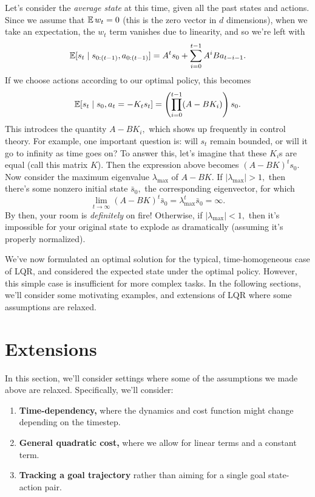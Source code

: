 \documentclass[../main/main]{subfiles}
\begin{document}
Let's consider the \emph{average state} at this time, given all the past states and actions.
Since we assume that $\operatorname*{\mathbb{E}} w_t = 0$ (this is the zero vector in $d$ dimensions),
when we take an expectation, the $w_t$ term vanishes due to linearity, and so we're left with \[
    \operatorname*{\mathbb{E}} [s_t \mid s_{0:(t-1)}, a_{0:(t-1)}] = A^t s_0 + \sum_{i=0}^{t-1} A^i B a_{t-i-1}.
\]
If we choose actions according to our optimal policy, this becomes \[
    \operatorname*{\mathbb{E}} [s_t \mid s_0, a_t = - K_t s_t] = \left( \prod_{i=0}^{t-1} (A - B K_i) \right) s_0.
\]
This introdces the quantity $A - B K_i,$ which shows up frequently in control theory.
For example, one important question is: will $s_t$ remain bounded,
or will it go to infinity as time goes on?
To answer this, let's imagine that these $K_i$s are equal (call this matrix $K$).
Then the expression above becomes $(A-BK)^t s_0.$
Now consider the maximum eigenvalue $\lambda_{\max}$ of $A - BK.$
If $|\lambda_{\max}| > 1,$ then there's some nonzero initial state $\bar s_0,$ the corresponding eigenvector, for which \[
    \lim_{t \to \infty} (A - BK)^t \bar s_0 = \lambda_{\max}^t \bar s_0 = \infty.
\]
By then, your room is \emph{definitely} on fire! Otherwise, if $|\lambda_{\max}| < 1,$ then it's impossible for your original state to explode as dramatically (assuming it's properly normalized).

We've now formulated an optimal solution for the typical, time-homogeneous case of LQR, and considered the expected state under the optimal policy.
However, this simple case is insufficient for more complex tasks.
In the following sections, we'll consider some motivating examples, and extensions of LQR where some assumptions are relaxed.

\section{Extensions}

In this section, we'll consider settings where some of the assumptions we made above are relaxed.
Specifically, we'll consider:
\begin{enumerate}
    \item \textbf{Time-dependency,} where the dynamics and cost function might change depending on the timestep.
    \item \textbf{General quadratic cost,} where we allow for linear terms and a constant term.
    \item \textbf{Tracking a goal trajectory} rather than aiming for a single goal state-action pair.
\end{enumerate}
\end{document}
